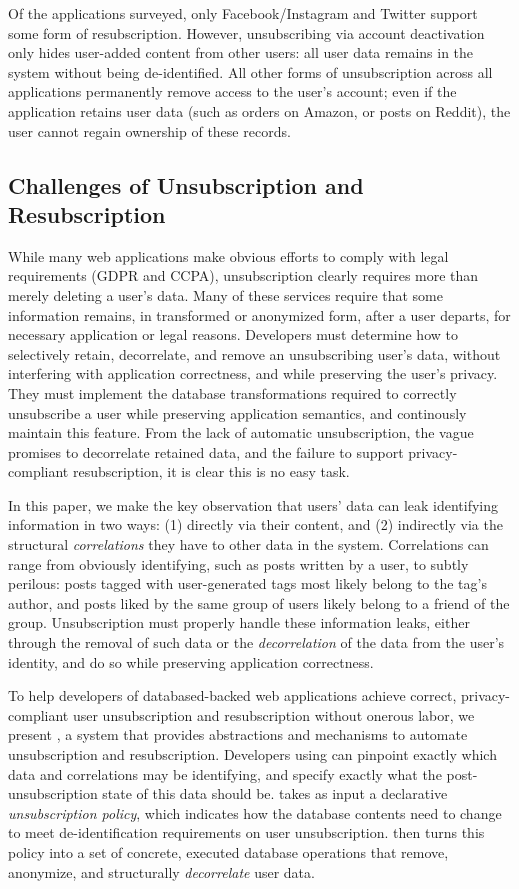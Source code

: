 Of the applications surveyed, only Facebook/Instagram and Twitter support some form of
resubscription. However, unsubscribing via account deactivation only hides user-added content from
other users: all user data remains in the system without being de-identified.  All other forms of
unsubscription across all applications permanently remove access to the user's account; even if the
application retains user data (such as orders on Amazon, or posts on Reddit), the user cannot regain
ownership of these records.

\subsection{Challenges of Unsubscription and Resubscription}
While many web applications make obvious efforts to comply with legal requirements (GDPR and CCPA),
unsubscription clearly requires more than merely deleting a user's data. Many of these services
require that some information remains, in transformed or anonymized form, after a user departs, for
necessary application or legal reasons. 
%
Developers must determine how to selectively retain, decorrelate, and remove an unsubscribing user's data,
without interfering with application correctness, and while preserving the user's privacy. They must 
implement the database transformations required to correctly unsubscribe a user while
preserving application semantics, and continously maintain this feature. 
%
From the lack of automatic unsubscription, the vague promises to decorrelate retained data, and the
failure to support privacy-compliant resubscription, it is clear this is no easy task.
%

In this paper, we make the key observation that users' data can leak identifying information
in two ways: (1) directly via their content, and (2) indirectly via the structural
\emph{correlations} they have to other data in the system. Correlations can range from obviously
identifying, such as posts written by a user, to subtly perilous: posts tagged with user-generated
tags most likely belong to the tag's author, and posts liked by the same group of users likely
belong to a friend of the group.
Unsubscription must properly handle these information leaks, either through the removal of such data or
the \emph{decorrelation} of the data from the user's identity, and do so while preserving
application correctness.

%
To help developers of databased-backed web applications achieve correct, privacy-compliant user
unsubscription and resubscription without onerous labor, we present \sys, a system that provides
abstractions and mechanisms to automate unsubscription and resubscription.
%
Developers using \sys can pinpoint exactly which data and correlations may be identifying, and
specify exactly what the post-unsubscription state of this data should be. \sys takes as input 
a declarative \emph{unsubscription policy}, which indicates how the database contents need
to change to meet de-identification requirements on user unsubscription.
%
\sys then turns this policy into a set of concrete, executed database operations that remove,
anonymize, and structurally \emph{decorrelate} user data.


